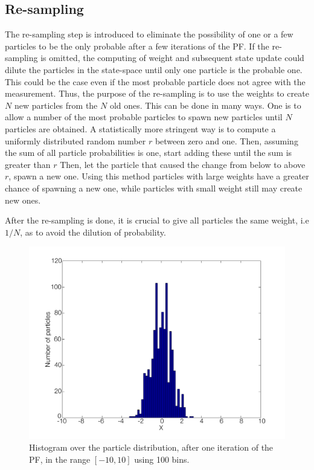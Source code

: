 \documentclass{LTHthesis}
\begin{document}
\subsection{Re-sampling}
%
The re-sampling step is introduced to eliminate the possibility of one or a few particles to be the only probable after a few iterations of the PF. If the re-sampling is omitted, the computing of weight and subsequent state update could dilute the particles in the state-space until only one particle is the probable one. This could be the case even if the most probable particle does not agree with the measurement. Thus, the purpose of the re-sampling is to use the weights to create $N$ new particles from the $N$ old ones. This can be done in many ways. One is to allow a number of the most probable particles to spawn new particles until $N$ particles are obtained. A statistically more stringent way is to compute a uniformly distributed random number $r$ between zero and one. Then, assuming the sum of all particle probabilities is one, start adding these until the sum is greater than $r$ Then, let the particle that caused the change from below to above $r$, spawn a new one. Using this method particles with large weights have a greater chance of spawning a new one, while particles with small weight still may create new ones.

After the re-sampling is done, it is crucial to give all particles the same weight, i.e $1/N$, as to avoid the dilution of probability.
%
\begin{figure}[!hbt]

\includegraphics[width=1\textwidth ]{images/PF/hist_dist_1_itr}
\caption{Histogram over the particle distribution, after one iteration of the PF, in the range $[-10,10]$ using 100 bins.}\label{hist_dist_1_itr}
\end{figure}
\end{document}
